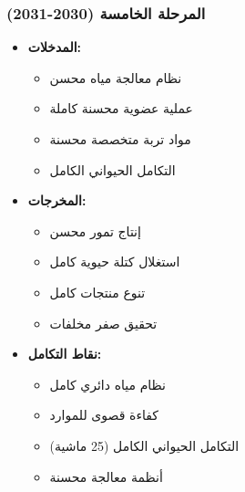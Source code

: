 \subsubsection{المرحلة الخامسة (2030-2031)}
\begin{itemize}
    \item \textbf{المدخلات:}
    \begin{itemize}
        \item نظام معالجة مياه محسن
        \item عملية عضوية محسنة كاملة
        \item مواد تربة متخصصة محسنة
        \item التكامل الحيواني الكامل
    \end{itemize}
    \item \textbf{المخرجات:}
    \begin{itemize}
        \item إنتاج تمور محسن
        \item استغلال كتلة حيوية كامل
        \item تنوع منتجات كامل
        \item تحقيق صفر مخلفات
    \end{itemize}
    \item \textbf{نقاط التكامل:}
    \begin{itemize}
        \item نظام مياه دائري كامل
        \item كفاءة قصوى للموارد
        \item التكامل الحيواني الكامل (25 ماشية)
        \item أنظمة معالجة محسنة
    \end{itemize}
\end{itemize}

